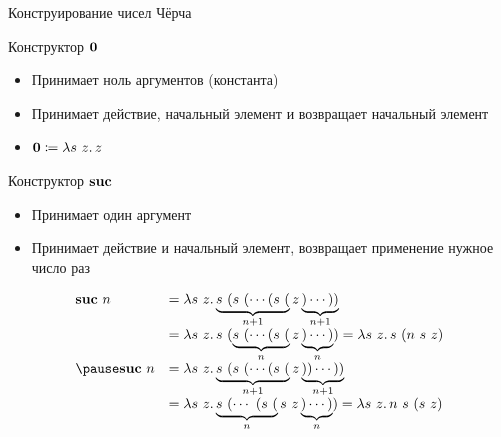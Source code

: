     \begin{frame}[fragile]{Конструирование чисел Чёрча}
        \pause
        \vspace{-0.5em}
        \begin{block}{Конструктор $\mathbf{0}$}
            \begin{itemize}
                \item Принимает ноль аргументов (константа)
                \item Принимает действие, начальный элемент и возвращает начальный элемент
                \item $\mathbf{0} \coloneqq \lambda s~z\ldotp z$
            \end{itemize}
        \end{block}
        \pause
        \begin{block}{Конструктор $\mathbf{suc}$}
            \begin{itemize}
                \item Принимает один аргумент
                \item Принимает действие и начальный элемент, возвращает применение нужное число раз
            \end{itemize}
            \[
                \begin{array}{l l}
                    \term{suc} \ap n
                    & = \lambda s~z\ldotp \underbrace{s~(s~(\cdots (s~(}_{n+1} z\underbrace{)\cdots ))}_{n+1}  \\
                    & = \lambda s~z\ldotp s~(\underbrace{s~(\cdots (s~(}_n z\underbrace{)\cdots )}_n)
                    = \lambda s~z\ldotp s~(n~s~z) \\ \pause
                    \term{suc} \ap n
                    & = \lambda s~z\ldotp \underbrace{s~(s~(\cdots (s~(}_{n+1} z\underbrace{))\cdots ))}_{n+1} \\
                    & = \lambda s~z\ldotp \underbrace{s~(\cdots~(s~(}_n s~z\underbrace{)\cdots )}_n)
                    = \lambda s~z\ldotp n~s~(s~z)
                \end{array}
            \]
        \end{block}
    \end{frame}

